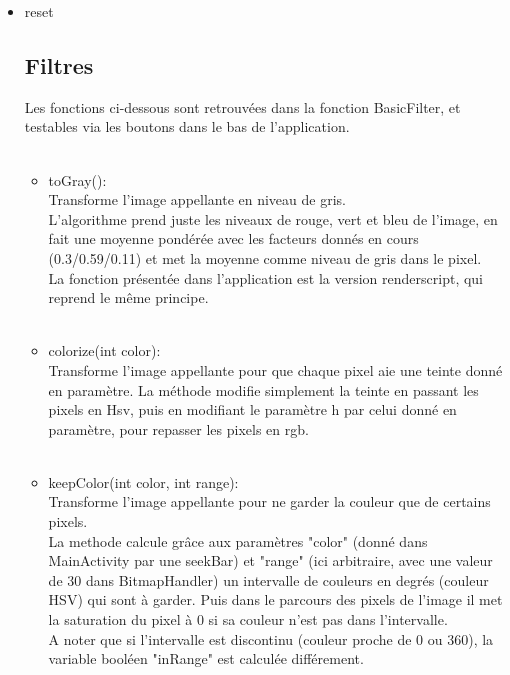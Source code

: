 \documentclass[12pt]{article}
\begin{document}
    \begin{itemize}
        \item reset

    \subsection{Filtres}
    Les fonctions ci-dessous sont retrouvées dans la fonction BasicFilter, et testables via les boutons dans le bas de l'application.\\
    \\

    \begin{itemize}
        \item toGray():\\ 
        Transforme l'image appellante en niveau de gris.\\
        L'algorithme prend juste les niveaux de rouge, vert et bleu de l'image, en fait une moyenne pondérée avec les facteurs donnés en cours (0.3/0.59/0.11) 
        et met la moyenne comme niveau de gris dans le pixel.
        \\
        La fonction présentée dans l'application est la version renderscript, qui reprend le même principe.\\
        \\
        \item colorize(int color):\\
        Transforme l'image appellante pour que chaque pixel aie une teinte donné en paramètre.
        La méthode modifie simplement la teinte en passant les pixels en Hsv, puis en modifiant le paramètre h par celui donné en paramètre, pour repasser les pixels en rgb.\\ 
        \\
        \item keepColor(int color, int range):\\
        Transforme l'image appellante pour ne garder la couleur que de certains pixels.\\
        La methode calcule grâce aux paramètres "color" (donné dans MainActivity par une seekBar) et "range" (ici arbitraire, avec une valeur de 30 dans BitmapHandler) un intervalle de couleurs en degrés (couleur HSV) qui sont à garder. Puis dans le parcours des pixels de l'image il 
        met la saturation du pixel à 0 si sa couleur n'est pas dans l'intervalle.\\
        A noter que si l'intervalle est discontinu (couleur proche de 0 ou 360), la variable booléen "inRange" est calculée différement.\\

\end{itemize}
\end{itemize}
\end{document}
